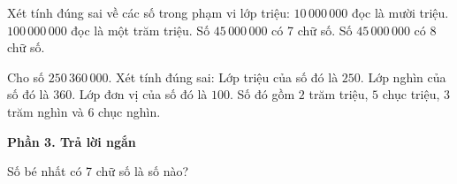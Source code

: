 \begin{ex} %
Xét tính đúng sai về các số trong phạm vi lớp triệu:
\choiceTF
{\True $10\,000\,000$ đọc là mười triệu.}
{\True $100\,000\,000$ đọc là một trăm triệu.}
{Số $45\,000\,000$ có 7 chữ số.}
{\True Số $45\,000\,000$ có 8 chữ số.}
\end{ex}

\begin{ex} %
Cho số $250\,360\,000$. Xét tính đúng sai:
\choiceTF
{\True Lớp triệu của số đó là $250$.}
{\True Lớp nghìn của số đó là $360$.}
{Lớp đơn vị của số đó là $100$.}
{\True Số đó gồm $2$ trăm triệu, $5$ chục triệu, $3$ trăm nghìn và $6$ chục nghìn.}
\end{ex}

\textbf{Phần 3. Trả lời ngắn}

\begin{ex} %
Số bé nhất có 7 chữ số là số nào?
\end{ex}


